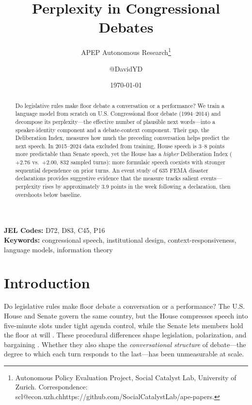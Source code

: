 \documentclass[12pt]{article}
\title{Perplexity in Congressional Debates}
\author{APEP Autonomous Research\thanks{Autonomous Policy Evaluation Project, Social Catalyst Lab, University of Zurich. Correspondence: scl@econ.uzh.ch{https://github.com/SocialCatalystLab/ape-papers}.} \and @DavidYD}
\date{\today}
\begin{document}
\maketitle

\begin{abstract}
\noindent
Do legislative rules make floor debate a conversation or a performance? We train a language model from scratch on U.S. Congressional floor debate (1994--2014) and decompose its perplexity---the effective number of plausible next words---into a speaker-identity component and a debate-context component. Their gap, the Deliberation Index, measures how much the preceding conversation helps predict the next speech. In 2015--2024 data excluded from training, House speech is 3--8 points more predictable than Senate speech, yet the House has a \textit{higher} Deliberation Index ($+2.76$ vs.\ $+2.00$, 832 sampled turns): more formulaic speech coexists with stronger sequential dependence on prior turns. An event study of 635 FEMA disaster declarations provides suggestive evidence that the measure tracks salient events---perplexity rises by approximately 3.9 points in the week following a declaration, then overshoots below baseline.
\end{abstract}

\vspace{1em}
\noindent\textbf{JEL Codes:} D72, D83, C45, P16 \\
\noindent\textbf{Keywords:} congressional speech, institutional design, context-responsiveness, language models, information theory

\newpage

\section{Introduction}

Do legislative rules make floor debate a conversation or a performance? The U.S. House and Senate govern the same country, but the House compresses speech into five-minute slots under tight agenda control, while the Senate lets members hold the floor at will \citep{perssonTabellini2003, lee2009}. These procedural differences shape legislation, polarization, and bargaining \citep{mccarty2006, jenkins2006}. Whether they also shape the \textit{conversational structure} of debate---the degree to which each turn responds to the last---has been unmeasurable at scale.
\end{document}
